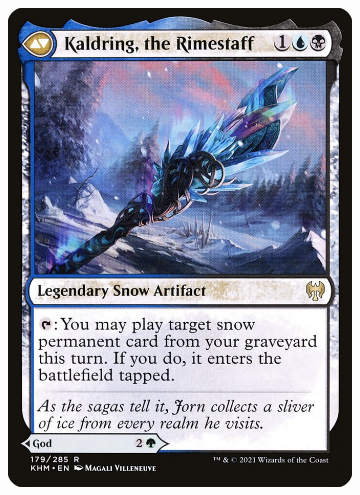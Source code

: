 \begin{figure}[ht]
\begin{subfigure}{0.25\textwidth}
		\includegraphics[width=1.0\textwidth]{Immagini/khm-179-kaldring-the-rimestaff.jpg}
	\end{subfigure}%
 	\begin{subfigure}{0.25\textwidth}

\end{subfigure}
\end{figure}

